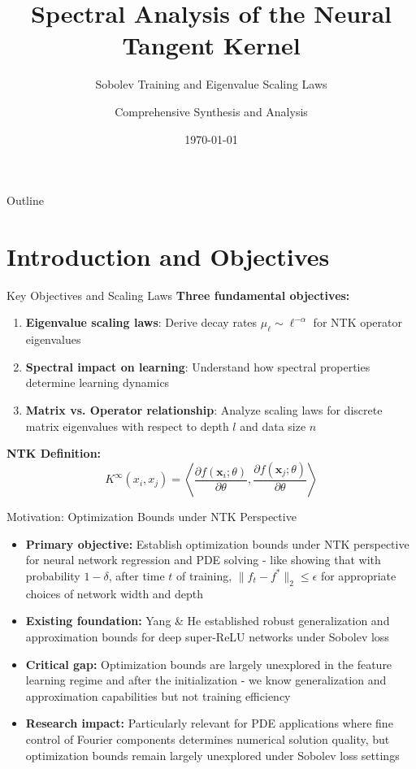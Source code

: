 \documentclass{beamer}
\title{Spectral Analysis of the Neural Tangent Kernel}
\subtitle{Sobolev Training and Eigenvalue Scaling Laws}
\author{Comprehensive Synthesis and Analysis}
\date{\today}
\begin{document}
\begin{frame}
\titlepage
\end{frame}

\begin{frame}{Outline}
\tableofcontents
\end{frame}

\section{Introduction and Objectives}

\begin{frame}{Key Objectives and Scaling Laws}
\textbf{Three fundamental objectives:}
\begin{enumerate}
\item \textbf{Eigenvalue scaling laws}: Derive decay rates $\mu_\ell \sim \ell^{-\alpha}$ for NTK operator eigenvalues
\item \textbf{Spectral impact on learning}: Understand how spectral properties determine learning dynamics
\item \textbf{Matrix vs. Operator relationship}: Analyze scaling laws for discrete matrix eigenvalues with respect to depth $l$ and data size $n$
\end{enumerate}

\textbf{NTK Definition:}
$$K^{\infty}(x_i, x_j) = \left\langle \frac{\partial f(\mathbf{x}_i; \theta)}{\partial \theta}, \frac{\partial f(\mathbf{x}_j; \theta)}{\partial \theta} \right\rangle$$
\end{frame}

\begin{frame}{Motivation: Optimization Bounds under NTK Perspective}
\begin{itemize}
\item \textbf{Primary objective:} Establish optimization bounds under NTK perspective for neural network regression and PDE solving - like showing that with probability $1-\delta$, after time $t$ of training, $\|f_t - f^*\|_2 \leq \epsilon$ for appropriate choices of network width and depth

\item \textbf{Existing foundation:} Yang \& He established robust generalization and approximation bounds for deep super-ReLU networks under Sobolev loss

\item \textbf{Critical gap:} Optimization bounds are largely unexplored in the feature learning regime and after the initialization - we know generalization and approximation capabilities but not training efficiency
\item \textbf{Research impact:} Particularly relevant for PDE applications where fine control of Fourier components determines numerical solution quality, but optimization bounds remain largely unexplored under Sobolev loss settings
\end{itemize}
\end{frame}
\end{document}
